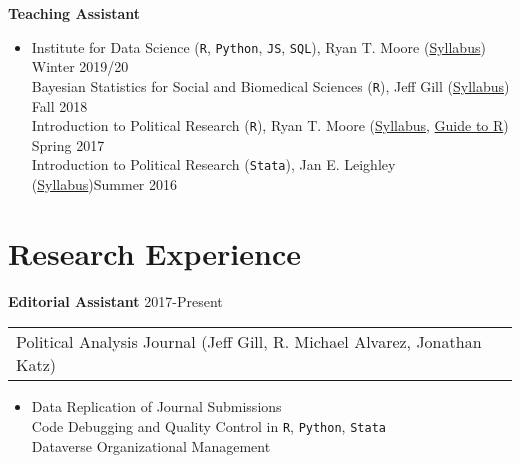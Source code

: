 \documentclass[11pt]{article}
\begin{document}
\begin{flushleft}
\textbf{Teaching Assistant}

\vspace{-0.3cm}
\begin{itemize}
\item[] Institute for Data Science (\texttt{R}, \texttt{Python}, \texttt{JS}, \texttt{SQL}), Ryan T. Moore (\href{https://www.american.edu/spa/data-science/upload/syl-2020.pdf}{Syllabus}) \hfill{Winter 2019/20}\\

Bayesian Statistics for Social and Biomedical Sciences (\texttt{R}), Jeff Gill (\href{http://jeffgill.org/classes/american-university-statistics-618spa-696-every-fall-bayesian-statistics-social-and}{Syllabus}) \hfill{Fall 2018}\\

Introduction to Political Research (\texttt{R}), Ryan T. Moore (\href{https://www.simonheuberger.com/files/teaching/syll_spring_2017_310.pdf}{Syllabus}, \href{https://www.simonheuberger.com/files/teaching/intro_using_r.pdf}{Guide to R}) \hfill{Spring 2017}\\

Introduction to Political Research (\texttt{Stata}), Jan E. Leighley (\href{https://www.simonheuberger.com/files/teaching/syll_summer_2016_310.pdf}{Syllabus})\hfill{Summer 2016}
\end{itemize}



\section*{Research Experience}

\textbf{Editorial Assistant} \hfill{2017-Present}

\begin{tabular*}{1\textwidth}{@{\extracolsep{\fill}}l}
Political Analysis Journal (Jeff Gill, R. Michael Alvarez, Jonathan Katz)
\end{tabular*}
\vspace{-0.6cm}

\begin{itemize}
\item[] Data Replication of Journal Submissions \\
Code Debugging and Quality Control in \texttt{R}, \texttt{Python}, \texttt{Stata}\\
Dataverse Organizational Management
 
\end{itemize}




\end{flushleft}
\end{document}
